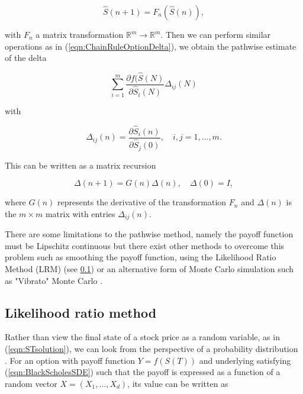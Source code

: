 \begin{equation} \label{eqn:EulerMatrixForm}
    \hat{S}(n + 1) = F_n(\hat{S}(n)),
\end{equation}

with $F_n$ a matrix transformation $\mathbb{R}^m \to \mathbb{R}^m$. Then we can perform similar operations as in (\ref{eqn:ChainRuleOptionDelta}), we obtain the pathwise estimate of the delta

\begin{equation} \label{eqn:MatrixPathwiseDeltaEstimate}
    \sum_{i=1}^m \frac{\partial f(\hat{S}(N)}{\partial \hat{S}_i(N)} \Delta_{ij}(N)
\end{equation}

with

\begin{equation*}
    \Delta_{ij}(n) = \frac{\partial \hat{S}_i(n)}{\partial \hat{S}_j(0)}, \quad i,j = 1, \dots, m.
\end{equation*}

This can be written as a matrix recursion

\begin{equation} \label{eqn:DeltaMatrixRecursion}
    \Delta (n + 1) = G(n) \Delta (n), \quad \Delta (0) = I,
\end{equation}

where $G(n)$ represents the derivative of the transformation $F_n$ and $\Delta (n)$ is the $m \times m$ matrix with entries $\Delta_{ij}(n)$.

There are some limitations to the pathwise method, namely the payoff function must be Lipschitz continuous but there exist other methods to overcome this problem such as smoothing the payoff function, using the Likelihood Ratio Method (LRM) (see \ref{sec:LikelihoodRatioMethod}) or an alternative form of Monte Carlo simulation such as "Vibrato" Monte Carlo \cite{giles2009vibrato}.

\subsection{Likelihood ratio method} \label{sec:LikelihoodRatioMethod}
Rather than view the final state of a stock price as a random variable, as in (\ref{eqn:STsolution}), we can look from the perspective of a probability distribution \cite{broadie1996estimating}. For an option with payoff function $Y = f(S(T))$ and underlying satisfying (\ref{eqn:BlackScholesSDE}) such that the payoff is expressed as a function of a random vector $X = (X_1,\dots,X_d)$, its value can be written as

